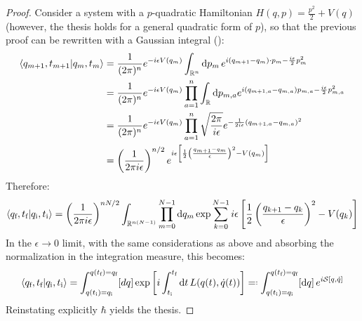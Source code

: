 \begin{proofbox}
  \begin{proof}
    Consider a system with a $ p $-quadratic Hamiltonian $ H(q,p) = \frac{p^2}{2} + V(q) $ (however, the thesis holds for a general quadratic form of $ p $), so that the previous proof can be rewritten with a Gaussian integral ():
    \begin{equation*}
      \begin{split}
        \braket{q_{m+1} , t_{m+1} | q_m , t_m}
        & = \frac{1}{(2\pi)^n} e^{-i \epsilon V(q_m)} \int_{\mathbb{R}^n} \mathrm{d} p_m\, e^{i (q_{m+1} - q_m) \cdot p_m - \frac{i \epsilon}{2} p_m^2} \\
        & = \frac{1}{(2\pi)^n} e^{-i \epsilon V(q_m)} \prod_{a = 1}^n \int_{\mathbb{R}} \mathrm{d} p_{m,a} e^{i (q_{m+1,a} - q_{m,a}) p_{m,a} - \frac{i \epsilon}{2} p_{m,a}^2} \\
        & = \frac{1}{(2\pi)^n} e^{-i \epsilon V(q_m)} \prod_{a = 1}^n \sqrt{\frac{2\pi }{i\epsilon}} e^{- \frac{1}{2i \epsilon} (q_{m+1,a} - q_{m,a})^2} \\
        & = \left( \frac{1}{2\pi i \epsilon} \right)^{n/2} e^{i \epsilon \left[ \frac{1}{2} \left( \frac{q_{m+1} - q_m}{\epsilon} \right)^2 - V(q_m) \right]}
      \end{split}
    \end{equation*}
    Therefore:
    \begin{equation*}
      \braket{q_\text{f},t_\text{f} | q_\text{i},t_\text{i}} = \left( \frac{1}{2\pi i \epsilon} \right)^{nN/2} \int_{\mathbb{R}^{n(N-1)}} \prod_{m = 0}^{N-1} \mathrm{d} q_m \exp \sum_{k = 0}^{N - 1} i \epsilon \left[ \frac{1}{2} \left( \frac{q_{k+1} - q_k}{\epsilon} \right)^2 - V(q_k) \right]
    \end{equation*}
    In the $ \epsilon \rightarrow 0 $ limit, with the same considerations as above and absorbing the normalization in the integration measure, this becomes:
    \begin{equation*}
      \braket{q_\text{f},t_\text{f} | q_\text{i},t_\text{i}} = \int_{q(t_\text{i}) = q_\text{i}}^{q(t_\text{f}) = q_\text{f}} [dq] \exp \left[ i \int_{t_\text{i}}^{t_\text{f}} \dd t\, L(q(t),\dot q(t)) \right] \eqdef \int_{q(t_\text{i}) = q_\text{i}}^{q(t_\text{f}) = q_\text{f}} [\dd q]\, e^{i \act[q,\dot q]}
    \end{equation*}
    Reinstating explicitly $ \hbar $ yields the thesis.
  \end{proof}
\end{proofbox}

